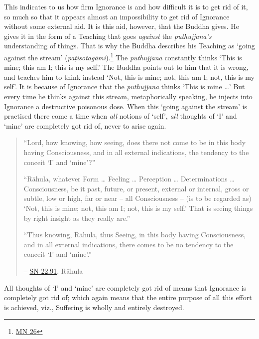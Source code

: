 This indicates to us how firm Ignorance is and how difficult it is to get rid of it, so much so that it appears almost an impossibility to get rid of Ignorance without some external aid. It is this aid, however, that the Buddha gives. He gives it in the form of a Teaching that goes \emph{against} the \textit{puthujjana's} understanding of things. That is why the Buddha describes his Teaching as `going against the stream' (\textit{paṭisotagāmi}).\footnote{\href{https://suttacentral.net/mn26/en/bodhi}{MN 26}} The \textit{puthujjana} constantly thinks `This is mine; this am I; this is my self.' The Buddha points out to him that it is wrong, and teaches him to think instead `Not, this is mine; not, this am I; not, this is my self'. It is because of Ignorance that the \textit{puthujjana} thinks `This is mine \ldots\hspace{0pt}' But every time he thinks against this stream, metaphorically speaking, he injects into Ignorance a destructive poisonous dose. When this `going against the stream' is practised there come a time when \emph{all} notions of `self', \emph{all} thoughts of `I' and `mine' are completely got rid of, never to arise again.

\begin{quote}
``Lord, how knowing, how seeing, does there not come to be in this body having Consciousness, and in all external indications, the tendency to the conceit `I' and `mine'?''

``Rāhula, whatever Form \ldots\hspace{0pt} Feeling \ldots\hspace{0pt} Perception \ldots\hspace{0pt} Determinations \ldots\hspace{0pt} Consciousness, be it past, future, or present, external or internal, gross or subtle, low or high, far or near -- all Consciousness -- (is to be regarded as) `Not, this is mine; not, this am I; not, this is my self.' That is seeing things by right insight as they really are.''

``Thus knowing, Rāhula, thus Seeing, in this body having Consciousness, and in all external indications, there comes to be no tendency to the conceit `I' and `mine'.''

 -- \href{https://suttacentral.net/sn22.91/en/bodhi}{SN 22.91}, Rāhula
\end{quote}

All thoughts of `I' and `mine' are completely got rid of means that Ignorance is completely got rid of; which again means that the entire purpose of all this effort is achieved, viz., Suffering is wholly and entirely destroyed.

